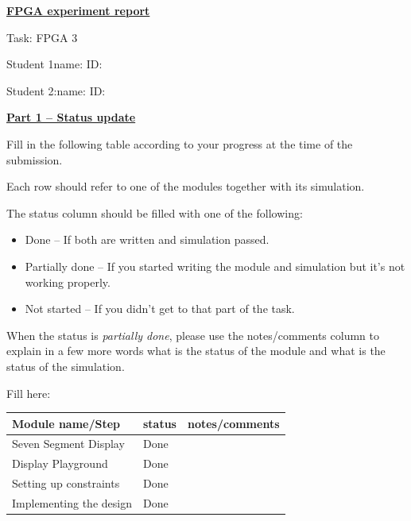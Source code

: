 \documentclass[11pt]{article}
\newcommand{\templatetitle}[1]{%
  \begin{center}
    {\fontsize{22pt}{26pt}\selectfont\textbf{\underline{#1}}}
  \end{center}
}
\newcommand{\templatesection}[1]{%
  \vspace{4pt}
  {\fontsize{14pt}{18pt}\selectfont\textbf{\underline{#1}}}
  \vspace{2pt}
}
\begin{document}
\templatetitle{FPGA experiment report}

Task: FPGA 3

Student 1\hspace{1.5em}name: \underline{\hspace{4cm}}\hspace{2em}ID: \underline{\hspace{3cm}}

Student 2:\hspace{1.5em}name: \underline{\hspace{4cm}}\hspace{2em}ID: \underline{\hspace{3cm}}

\vspace{6pt}

\templatesection{Part 1 -- Status update}

Fill in the following table according to your progress at the time of the submission.

Each row should refer to one of the modules together with its simulation.

The status column should be filled with one of the following:

\begin{itemize}[nosep, leftmargin=2em]
    \item Done -- If both are written and simulation passed.
    \item Partially done -- If you started writing the module and simulation but it's not working properly.
    \item Not started -- If you didn't get to that part of the task.
\end{itemize}

When the status is \textit{partially done}, please use the notes/comments column to explain in a few more words what is the status of the module and what is the status of the simulation.

\vspace{6pt}

Fill here:

\begin{tabularx}{\textwidth}{|X|X|X|}
\hline
Module name/Step & status & notes/comments \\
\hline
Seven Segment Display & Done & \\
\hline
Display Playground & Done & \\
\hline
Setting up constraints & Done & \\
\hline
Implementing the design & Done & \\
\hline
\end{tabularx}
\end{document}
